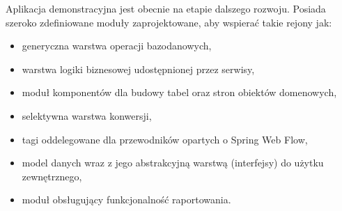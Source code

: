 Aplikacja demonstracyjna jest obecnie na etapie dalszego rozwoju. Posiada szeroko zdefiniowane moduły zaprojektowane, aby wspierać takie
rejony jak:
\begin{itemize}
	\item generyczna warstwa operacji bazodanowych,
	\item warstwa logiki biznesowej udostępnionej przez serwisy,
	\item moduł komponentów dla budowy tabel oraz stron obiektów domenowych,
	\item selektywna warstwa konwersji,
	\item tagi oddelegowane dla przewodników opartych o Spring Web Flow,
	\item model danych wraz z jego abstrakcyjną warstwą (interfejsy) do użytku zewnętrznego,
	\item moduł obsługujący funkcjonalność raportowania.
\end{itemize}

